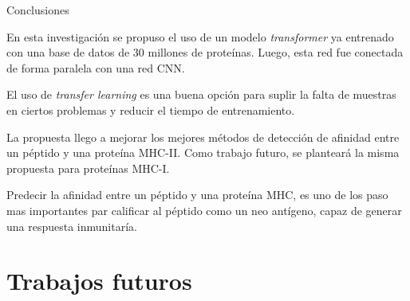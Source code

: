 \documentclass[10pt]{beamer}
\newcommand{\1}{
	\setbeamertemplate{background}{
		\texttt{[image: ../img/1]}
		\tikz[overlay] \fill[fill opacity=0.75,fill=white] (0,0) rectangle (-\paperwidth,\paperheight);
	}
}
\begin{document}
	
	\begin{frame}{Conclusiones}{}
		\begin{block}{}
			En esta investigación se propuso el uso de un modelo \textit{transformer} ya entrenado con una base de datos de 30 millones de proteínas. Luego, esta red fue conectada de forma paralela con una red CNN.
		\end{block}
		
		\begin{block}{}
			El uso de \textit{transfer learning} es una buena opción para suplir la falta de muestras en ciertos problemas y reducir el tiempo de entrenamiento.		
		\end{block}
		
		\begin{block}{}
			La propuesta llego a mejorar los mejores métodos de detección de afinidad entre un péptido y una proteína MHC-II. Como trabajo futuro, se planteará la misma propuesta para proteínas MHC-I.	
		\end{block}
		
		\begin{block}{}
			Predecir la afinidad entre un péptido y una proteína MHC, es uno de los paso mas importantes par calificar al péptido como un neo antígeno, capaz de generar una respuesta inmunitaría.
		\end{block}
	\end{frame}
	
	\section{Trabajos futuros}
	
\end{document}
